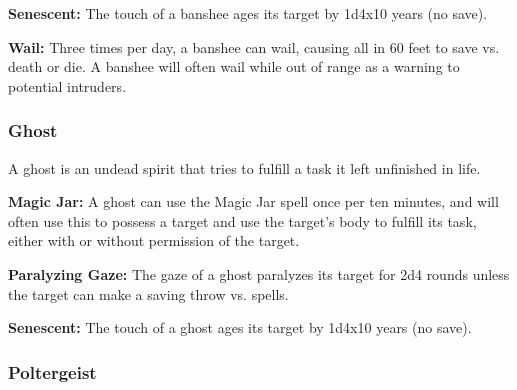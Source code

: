 \begin{multicols*}{2}
\textbf{Senescent:} The touch of a banshee ages its target by 1d4x10 years (no save).

\textbf{Wail:} Three times per day, a banshee can wail, causing all in 60 feet to save vs. death or die. A banshee will often wail while out of range as a warning to potential intruders.

\subsubsection{Ghost}

A ghost is an undead spirit that tries to fulfill a task it left unfinished in life.

\textbf{Magic Jar:} A ghost can use the Magic Jar spell once per ten minutes, and will often use this to possess a target and use the target’s body to fulfill its task, either with or without permission of the target.

\textbf{Paralyzing Gaze:} The gaze of a ghost paralyzes its target for 2d4 rounds unless the target can make a saving throw vs. spells.

\textbf{Senescent:} The touch of a ghost ages its target by 1d4x10 years (no save).

\subsubsection{Poltergeist}
\end{multicols*}
